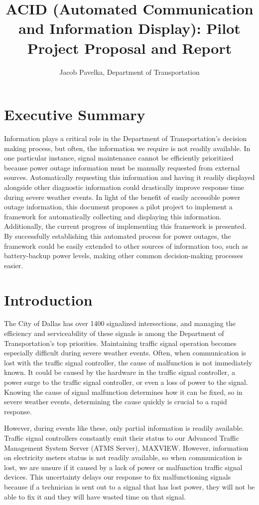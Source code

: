\documentclass[letterpaper, notitlepage]{report}
\title{ACID (Automated Communication and Information Display): Pilot Project Proposal and Report}
\author{Jacob Pavelka, Department of Transportation}
\begin{document}
\maketitle

\section{Executive Summary}

Information plays a critical role in the Department of Transportation's decision making process, but often, the information we require is not readily available. In one particular instance, signal maintenance cannot be efficiently prioritized because power outage information must be manually requested from external sources. Automatically requesting this information and having it readily displayed alongside other diagnostic information could drastically improve response time during severe weather events. In light of the benefit of easily accessible power outage information, this document proposes a pilot project to implement a framework for automatically collecting and displaying this information. Additionally, the current progress of implementing this framework is presented. By successfully establishing this automated process for power outages, the framework could be easily extended to other sources of information too, such as battery-backup power levels, making other common decision-making processes easier. 

\section{Introduction}

The City of Dallas has over 1400 signalized intersections, and managing the efficiency and serviceability of these signals is among the Department of Transportation's top priorities. Maintaining traffic signal operation becomes especially difficult during severe weather events. Often, when communication is lost with the traffic signal controller, the cause of malfunction is not immediately known. It could be caused by the hardware in the traffic signal controller, a power surge to the traffic signal controller, or even a loss of power to the signal. Knowing the cause of signal malfunction determines how it can be fixed, so in severe weather events, determining the cause quickly is crucial to a rapid response. 

However, during events like these, only partial information is readily available. Traffic signal controllers constantly emit their status to our Advanced Traffic Management System Server (ATMS Server), MAXVIEW. However, information on electricity meters status is not readily available, so when communication is lost, we are unsure if it caused by a lack of power or malfunction traffic signal devices. This uncertainty delays our response to fix malfunctioning signals because if a technician is sent out to a signal that has lost power, they will not be able to fix it and they will have wasted time on that signal.
\end{document}

